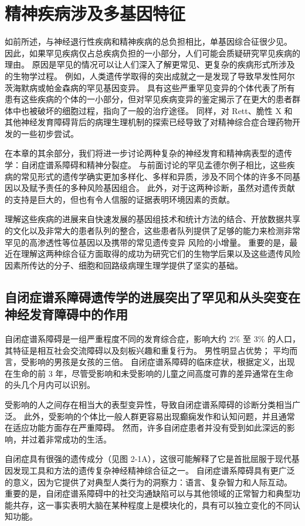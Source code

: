 \section{精神疾病涉及多基因特征}
如前所述，与神经退行性疾病和精神疾病的总负担相比，单基因综合征很少见。 
因此，如果罕见疾病仅占总疾病负担的一小部分，人们可能会质疑研究罕见疾病的理由。 
原因是罕见的情况可以让人们深入了解更常见、更复杂的疾病形式所涉及的生物学过程。 
例如，人类遗传学取得的突出成就之一是发现了导致早发性阿尔茨海默病或帕金森病的罕见基因变异。 
具有这些严重罕见变异的个体代表了所有患有这些疾病的个体的一小部分，但对罕见疾病变异的鉴定揭示了在更大的患者群体中也被破坏的细胞过程，指向了一般的治疗途径。 
同样，对 Rett、脆性 X 和其他神经发育障碍背后的病理生理机制的探索已经导致了对精神综合症合理药物开发的一些初步尝试。


在本章的其余部分，我们将进一步讨论两种复杂的神经发育和精神病表型的遗传学：自闭症谱系障碍和精神分裂症。 
与前面讨论的罕见孟德尔例子相比，这些疾病的常见形式的遗传学确实更加多样化、多样和异质，涉及不同个体的许多不同基因以及赋予责任的多种风险基因组合。 
此外，对于这两种诊断，虽然对遗传贡献的支持是巨大的，但也有令人信服的证据表明环境因素的贡献。


理解这些疾病的进展来自快速发展的基因组技术和统计方法的结合、开放数据共享的文化以及非常大的患者队列的整合，这些患者队列提供了足够的能力来检测非常罕见的高渗透性等位基因以及携带的常见遗传变异 风险的小增量。 
重要的是，最近在理解这两种综合征方面取得的成功为研究它们的生物学后果以及这些遗传风险因素所传达的分子、细胞和回路级病理生理学提供了坚实的基础。


\subsection{自闭症谱系障碍遗传学的进展突出了罕见和从头突变在神经发育障碍中的作用}
自闭症谱系障碍是一组严重程度不同的发育综合症，影响大约 2\% 至 3\% 的人口，其特征是相互社会交流障碍以及刻板兴趣和重复行为。 
男性明显占优势； 平均而言，受影响的男孩是女孩的三倍。 
自闭症谱系障碍的临床症状，根据定义，出现在生命的前 3 年，尽管受影响和未受影响的儿童之间高度可靠的差异通常在生命的头几个月内可以识别。


受影响的人之间存在相当大的表型变异性，导致自闭症谱系障碍的诊断分类相当广泛。 
此外，受影响的个体比一般人群更容易出现癫痫发作和认知问题，并且通常在适应功能方面存在严重障碍。 
然而，许多自闭症患者并没有受到如此深远的影响，并过着非常成功的生活。


自闭症具有很强的遗传成分（见图 2-1A），这很可能解释了它是首批屈服于现代基因发现工具和方法的遗传复杂神经精神综合征之一。 
自闭症谱系障碍具有更广泛的意义，因为它提供了对典型人类行为的洞察力：语言、复杂智力和人际互动。 
重要的是，自闭症谱系障碍中的社交沟通缺陷可以与其他领域的正常智力和典型功能共存，这一事实表明大脑在某种程度上是模块化的，具有可以独立变化的不同认知功能。


